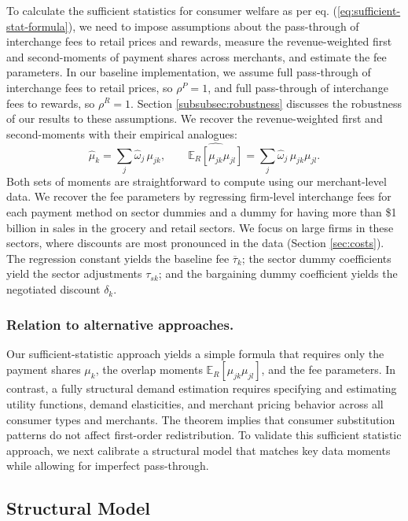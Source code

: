 \documentclass[main.tex]{subfiles}
\begin{document}
To calculate the sufficient statistics for consumer welfare as per eq. (\ref{eq:sufficient-stat-formula}), we need to impose assumptions about the pass-through of interchange fees to retail prices and rewards, measure the revenue-weighted first and second-moments of payment shares across merchants, and estimate the fee parameters.
In our baseline implementation, we assume full pass-through of interchange fees to retail prices, so $\rho^P=1$, and full pass-through of interchange fees to rewards, so $\rho^R=1$. 
Section \ref{subsubsec:robustness} discusses the robustness of our results to these assumptions.
We recover the revenue-weighted first and second-moments with their empirical analogues:
\[
\widehat{\mu}_k = \sum_j \widehat \omega_j\,\mu_{jk}, \qquad
\widehat{\mathbb{E}_R[\mu_{jk}\mu_{jl}]} = \sum_j \widehat \omega_j\,\mu_{jk}\mu_{jl}.
\]
Both sets of moments are straightforward to compute using our merchant-level data.
We recover the fee parameters by regressing firm-level interchange fees for each payment method on sector dummies and a dummy for having more than \$1 billion in sales in the grocery and retail sectors.
We focus on large firms in these sectors, where discounts are most pronounced in the data (Section \ref{sec:costs}).
The regression constant yields the baseline fee $\overline{\tau}_k$; the sector dummy coefficients yield the sector adjustments $\tau_{sk}$; and the bargaining dummy coefficient yields the negotiated discount $\delta_k$.

\subsubsection{Relation to alternative approaches.}

Our sufficient-statistic approach yields a simple formula that requires only the payment shares $\mu_k$, the overlap moments $\mathbb{E}_R[\mu_{jk}\mu_{jl}]$, and the fee parameters.
In contrast, a fully structural demand estimation requires specifying and estimating utility functions, demand elasticities, and merchant pricing behavior across all consumer types and merchants.
The theorem implies that consumer substitution patterns do not affect first-order redistribution.
To validate this sufficient statistic approach, we next calibrate a structural model that matches key data moments while allowing for imperfect pass-through.

\subsection{Structural Model}
\end{document}
